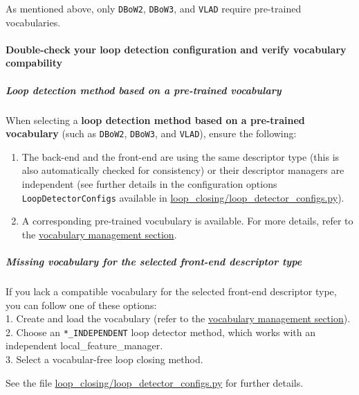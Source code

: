 \documentclass{article}
\let\oldparagraph\paragraph
\renewcommand{\paragraph}[1]{\oldparagraph{#1}\mbox{}}
\let\oldsubparagraph\subparagraph
\renewcommand{\subparagraph}[1]{\oldsubparagraph{#1}\mbox{}}
\begin{document}
As mentioned above, only \texttt{DBoW2}, \texttt{DBoW3}, and
\texttt{VLAD} require pre-trained vocabularies.

\hypertarget{double-check-your-loop-detection-configuration-and-verify-vocabulary-compability}{%
\paragraph{Double-check your loop detection configuration and verify
vocabulary
compability}\label{double-check-your-loop-detection-configuration-and-verify-vocabulary-compability}}

\hypertarget{loop-detection-method-based-on-a-pre-trained-vocabulary}{%
\subparagraph{Loop detection method based on a pre-trained
vocabulary}\label{loop-detection-method-based-on-a-pre-trained-vocabulary}}

When selecting a \textbf{loop detection method based on a pre-trained
vocabulary} (such as \texttt{DBoW2}, \texttt{DBoW3}, and \texttt{VLAD}),
ensure the following: 
\begin{enumerate}
\item The back-end and the front-end are using the
same descriptor type (this is also automatically checked for
consistency) or their descriptor managers are independent (see further
details in the configuration options \texttt{LoopDetectorConfigs}
available in \url{loop_closing/loop_detector_configs.py}). 
\item A corresponding pre-trained vocubulary is available. For more details,
refer to the \protect\hyperlink{vocabulary-management}{vocabulary
management section}.
\end{enumerate}

\hypertarget{missing-vocabulary-for-the-selected-front-end-descriptor-type}{%
\subparagraph{Missing vocabulary for the selected front-end descriptor
type}\label{missing-vocabulary-for-the-selected-front-end-descriptor-type}}

If you lack a compatible vocabulary for the selected front-end
descriptor type, you can follow one of these options:\\
1. Create and load the vocabulary (refer to the
\protect\hyperlink{vocabulary-management}{vocabulary management
section}).\\
2. Choose an \texttt{*\_INDEPENDENT} loop detector method, which works
with an independent local\_feature\_manager.\\
3. Select a vocabular-free loop closing method.

See the file \url{loop_closing/loop_detector_configs.py} for further
details.
\end{document}
